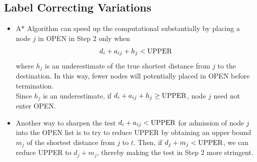 \subsection{Label Correcting Variations}
\begin{itemize}
    \item A* Algorithm can speed up the computational substantially by placing a node $j$ in OPEN in Step 2 only when
    \[
        d_i + a_{ij} + h_j < \text{\rm UPPER}
    \]
    where $h_j$ is an underestimate of the true shortest distance from $j$ to the destination. In this way, fewer nodes will potentially placed in OPEN before termination. \\
    Since $h_j$ is an underestimate, if $d_i+a_{ij}+h_j \geq \text{\rm UPPER}$, node $j$ need not enter OPEN.
    \item Another way to sharpen the test $d_i+a_{ij}<\text{\rm UPPER}$ for admission of node $j$ into the OPEN list is to try to reduce UPPER by obtaining an upper bound $m_j$ 
    of the shortest distance from $j$ to $t$. Then, if $d_j+m_j < \text{\rm UPPER}$, we can reduce UPPER to $d_j+m_j$, thereby making the test in Step 2 more stringent.
\end{itemize}